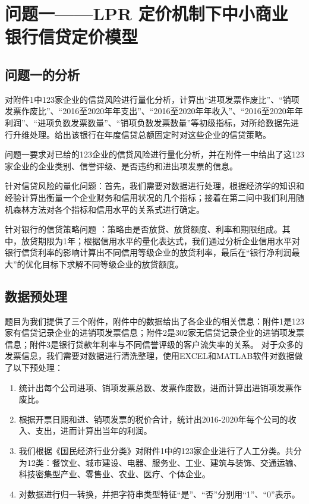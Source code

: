 \documentclass[withoutpreface,bwprint]{cumcmthesis} %
\begin{document}
\section{问题一——LPR 定价机制下中小商业银行信贷定价模型}
\subsection{问题一的分析}
对附件1中123家企业的信贷风险进行量化分析，计算出“进项发票作废比”、“销项发票作废比”、“2016至2020年年支出”、“2016至2020年年收入”、“2016至2020年年利润”、“进项负数发票数量”、“销项负数发票数量”等初级指标，对所给数据先进行升维处理。给出该银行在年度信贷总额固定时对这些企业的信贷策略。

问题一要求对已给的123企业的信贷风险进行量化分析，并在附件一中给出了这123家企业的企业类别、信誉评级、是否违约和进出项发票的信息。

针对信贷风险的量化问题：首先，我们需要对数据进行处理，根据经济学的知识和经验计算出衡量一个企业财务和信用状况的几个指标；接着在第二问中我们利用随机森林方法对各个指标和信用水平的关系式进行确定。

针对银行的信贷策略问题 \cite{杨伟歧2011商业银行中小企业信贷策略研究}：策略由是否放贷、放贷额度、利率和期限组成。其中，放贷期限为1年；根据信用水平的量化表达式，我们通过分析企业信用水平对银行信贷利率的影响计算出不同信用等级企业的放贷利率，最后在“银行净利润最大”的优化目标下求解不同等级企业的放贷额度。

\subsection{数据预处理}
题目为我们提供了三个附件，附件中的数据给出了各企业的相关信息：附件1是123家有信贷记录企业的进销项发票信息；附件2是302家无信贷记录企业的进销项发票信息；附件3是银行贷款年利率与不同信誉评级的客户流失率的关系。
对于众多的发票信息，我们需要对数据进行清洗整理，使用EXCEL和MATLAB软件对数据做了以下预处理：
\begin{enumerate}
	\item 统计出每个公司进项、销项发票总数、发票作废数，进而计算出进销项发票作废比。
	\item 根据开票日期和进、销项发票的税价合计，统计出2016-2020年每个公司的收入、支出，进而计算出当年的利润。
	\item 我们根据《国民经济行业分类》\cite{guominjingji}对附件1中的123家企业进行了人工分类。共分为12类：餐饮业、城市建设、电器、服务业、工业、建筑与装饰、交通运输、科技密集型产业、零售业、农业、医疗、个体企业。
	\item 对数据进行归一转换，并把字符串类型特征“是”、“否”分别用“1”、“0”表示。
\end{enumerate}
\end{document}
